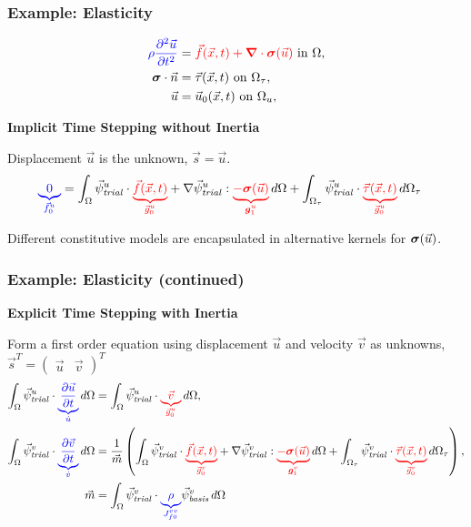\documentclass[aspectratio=169,hyperref=colorlinks]{beamer}
\begin{document}
\begin{frame}
  \frametitle{Example: Elasticity}
  \summary{}

      \begin{align}
        {\color{blue}\rho \frac{\partial^2\vec{u}}{\partial t^2}} &= {\color{red}\vec{f}(\vec{x},t) + \bm{\nabla} \cdot \bm{\sigma}(\vec{u})} \text{ in } \Omega, \\
        \bm{\sigma} \cdot \vec{n} &= \vec{\tau}(\vec{x},t) \text{ on } \Omega_\tau, \\
        \vec{u} &= \vec{u}_0(\vec{x},t) \text{ on } \Omega_u,
      \end{align}

      \vfill

      {\bf Implicit Time Stepping without Inertia}

      Displacement $\vec{u}$ is the unknown, $\vec{s}= \vec{u}$.
      \begin{align}
        \annotateL{0}{\vec{f}_0^u} &=
  \int_\Omega \trialvec[u] \cdot \annotateR{\vec{f}(\vec{x},t)}{\vec{g}_0^u} + \nabla \trialvec[u] : \annotateR{-\tensor{\sigma}(\vec{u})}{\tensor{g}_1^u} \, d\Omega + \int_{\Omega_\tau} \trialvec[u] \cdot \annotateR{\vec{\tau}(\vec{x},t)}{\vec{g}_0^u} \, d\Omega_\tau
      \end{align}

      \vfill
      Different constitutive models are encapsulated in alternative
      kernels for $\bm{\sigma}(\vec{u})$.

\end{frame}

\begin{frame}
  \frametitle{Example: Elasticity (continued)}
  \summary{}

      {\bf Explicit Time Stepping with Inertia}

      Form a first order equation using displacement $\vec{u}$ and velocity $\vec{v}$ as
      unknowns, $\vec{s}^T = \left( \begin{array}{cc} \vec{u} & \vec{v} \end{array} \right)^T$
      \begin{align}
        \int_\Omega \trialvec[u] \cdot \annotateL{\frac{\partial \vec{u}}{\partial t}}{\dot{u}} \, d\Omega &= 
        \int_\Omega \trialvec[u] \cdot \annotateR{\vec{v}}{\vec{g}_0^u} \, d\Omega, \\
        \int_\Omega \trialvec[v] \cdot \annotateL{\frac{\partial \vec{v}}{\partial t}}{\dot{v}} \, d\Omega &=
\frac{1}{\vec{m}} \left(
  \int_\Omega \trialvec[v] \cdot \annotateR{\vec{f}(\vec{x},t)}{\vec{g}_0^v} + \nabla \trialvec[v] : \annotateR{-\tensor{\sigma}(\vec{u})}{\tensor{g}_1^v} \, d\Omega + \int_{\Omega_\tau} \trialvec[v] \cdot \annotateR{\vec{\tau}(\vec{x},t)}{\vec{g}_0^v} \, d\Omega_\tau \right), \\
\vec{m} &= \int_\Omega \trialvec[v] \cdot {\annotateL{\rho}{J_{f0}^{vv}}} \basisvec[v] \, d\Omega
      \end{align}


\end{frame}
\end{document}
